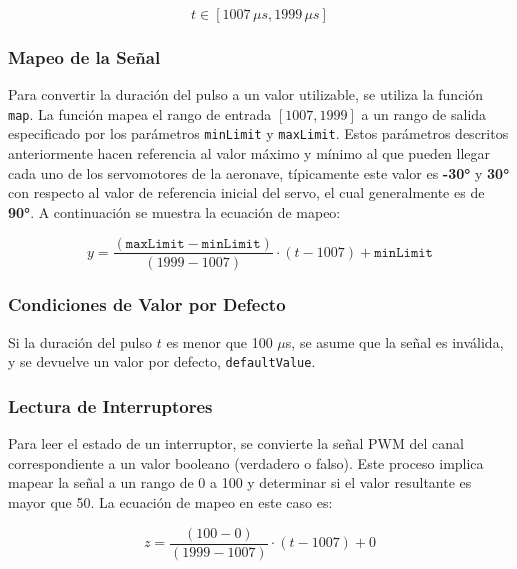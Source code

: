             \begin{equation*}
            t \in [1007 \, \mu s, 1999 \, \mu s]
            \end{equation*}
    
        \subsubsection{Mapeo de la Señal}
  
            Para convertir la duración del pulso a un valor utilizable, se utiliza la función \texttt{map}. La función mapea el rango de entrada \([1007, 1999]\) a un rango de salida especificado por los parámetros \texttt{minLimit} y \texttt{maxLimit}. Estos parámetros descritos anteriormente hacen referencia al valor máximo y mínimo al que pueden llegar cada uno de los servomotores de la aeronave, típicamente este valor es \textbf{-30°} y \textbf{30°} con respecto al valor de referencia inicial del servo, el cual generalmente es de \textbf{90°}. A continuación se muestra la ecuación de mapeo:


            \begin{equation*}
            y = \frac{(\texttt{maxLimit} - \texttt{minLimit})}{(1999 - 1007)} \cdot (t - 1007) + \texttt{minLimit}
            \end{equation*}
    
        \subsubsection{Condiciones de Valor por Defecto}
  
            Si la duración del pulso \( t \) es menor que 100 $\mu$s, se asume que la señal es inválida, y se devuelve un valor por defecto, \texttt{defaultValue}.
   
        \subsubsection{Lectura de Interruptores}
   
            Para leer el estado de un interruptor, se convierte la señal PWM del canal correspondiente a un valor booleano (verdadero o falso). Este proceso implica mapear la señal a un rango de 0 a 100 y determinar si el valor resultante es mayor que 50. La ecuación de mapeo en este caso es:

            \begin{equation}
            z = \frac{(100 - 0)}{(1999 - 1007)} \cdot (t - 1007) + 0
            \end{equation}

